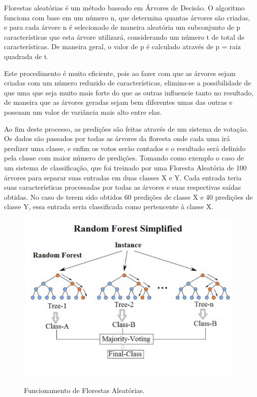 Florestas aleatórias é um método baseado em Árvores de Decisão. O algoritmo funciona com base em um número n, que determina quantas árvores são criadas, e para cada árvore n é selecionado de maneira aleatória um subconjunto de p características que esta árvore utilizará, considerando um número t de total de características. De maneira geral, o valor de p é calculado através de p = raiz quadrada de t. \cite{James:2014:ISL:2517747}

Este procedimento é muito eficiente, pois ao fazer com que as árvores sejam criadas com um número reduzido de características, elimina-se a possibilidade de que uma que seja muito mais forte do que as outras influencie tanto no resultado, de maneira que as árvores geradas sejam bem diferentes umas das outras e possuam um valor de variância mais alto entre elas. \cite{Breiman2001} 

Ao fim deste processo, as predições são feitas através de um sistema de votação. Os dados são passados por todas as árvores da floresta onde cada uma irá predizer uma classe, e enfim os votos serão contados e o resultado será definido pela classe com maior número de predições. 
Tomando como exemplo o caso de um sistema de classificação, que foi treinado por uma Floresta Aleatória de 100 árvores para separar suas entradas em duas classes X e Y. Cada entrada teria suas características processadas por todas as árvores e suas respectivas saídas obtidas. No caso de terem sido obtidos 60 predições de classe X e 40 predições de classe Y, essa entrada seria classificada como pertencente à classe X.

\begin{figure}[h]
\caption{\small Funcionamento de Florestas Aleatórias.}
\centering
\includegraphics[scale=0.60]{figs/random-forests.png}
\label{f.random-forest}
\end{figure}

